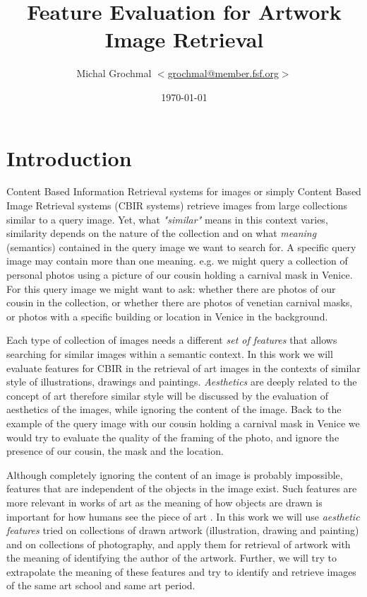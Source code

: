 \documentclass[a4paper]{article}
\title{Feature Evaluation for Artwork Image Retrieval}
\author{Michal Grochmal
  $<$\href{mailto:grochmal@member.fsf.org}{grochmal@member.fsf.org}$>$
}
\date{\today}
\begin{document}
\maketitle

\section{Introduction}

Content Based Information Retrieval systems for images or simply Content Based
Image Retrieval systems (CBIR systems) retrieve images from large collections
similar to a query image.  Yet, what \emph{"similar"} means in this context
varies, similarity depends on the nature of the collection and on what
\emph{meaning} (semantics) contained in the query image we want to search for.
A specific query image may contain more than one meaning.  e.g. we might query
a collection of personal photos using a picture of our cousin holding a
carnival mask in Venice.  For this query image we might want to ask: whether
there are photos of our cousin in the collection, or whether there are photos
of venetian carnival masks, or photos with a specific building or location in
Venice in the background.

Each type of collection of images needs a different \emph{set of features} that
allows searching for similar images within a semantic context.  In this work we
will evaluate features for CBIR in the retrieval of art images in the contexts
of similar style of illustrations, drawings and paintings.  \emph{Aesthetics}
are deeply related to the concept of art \cite{rmc12ajs} therefore similar
style will be discussed by the evaluation of aesthetics of the images, while
ignoring the content of the image.  Back to the example of the query image with
our cousin holding a carnival mask in Venice we would try to evaluate the
quality of the framing of the photo, and ignore the presence of our cousin, the
mask and the location.

Although completely ignoring the content of an image is probably impossible,
features that are independent of the objects in the image exist.  Such features
are more relevant in works of art \cite{zirnhelt07art} as the meaning of how
objects are drawn is important for how humans see the piece of art
\cite{mach10clas}.  In this work we will use \emph{aesthetic features} tried on
collections of drawn artwork (illustration, drawing and painting) and on
collections of photography, and apply them for retrieval of artwork with the
meaning of identifying the author of the artwork.  Further, we will try to
extrapolate the meaning of these features and try to identify and retrieve
images of the same art school and same art period.
\end{document}
